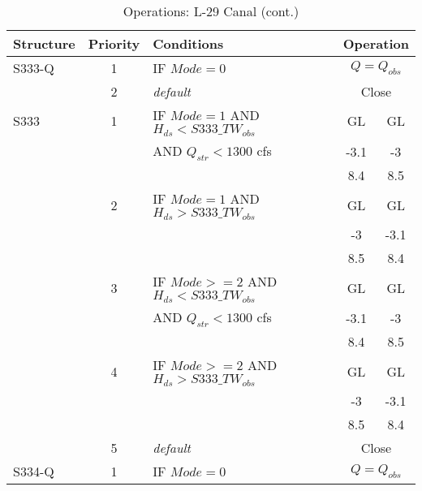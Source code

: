 \scriptsize
\begin{table}[!h]
\centering
\caption{Operations: L-29 Canal (cont.)}
\label{tab:M11opsL29}
\begin{tabular}{|l|c|l|c|c|}
\hline
\textbf{Structure} & \textbf{Priority}  & \textbf{Conditions} & \multicolumn{2}{|c|}{\textbf{Operation}}   \\
\hline
\hline
S333-Q        &  1  & IF $Mode=0$                   & \multicolumn{2}{|c|}{$Q = Q_{obs}$}   \\
\hline
              &  2  & \it{default}                  & \multicolumn{2}{|c|}{Close}           \\
\hline
S333          &  1  & IF $Mode=1$ AND $H_{ds}<S333\_TW_{obs}$                   & GL    & GL   \\
              &     & AND $Q_{str}<1300$ cfs   & -3.1  & -3   \\
              &     &        &  8.4  & 8.5  \\
\hline
              &  2  & IF $Mode=1$  AND $H_{ds}>S333\_TW_{obs}$                 & GL    & GL   \\
              &     &    & -3    & -3.1 \\
              &     &                               & 8.5   & 8.4  \\
\hline
              &  3  & IF $Mode>=2$ AND $H_{ds}<S333\_TW_{obs}$                  & GL    & GL   \\
              &     & AND $Q_{str}<1300$ cfs  & -3.1  & -3   \\
              &     &         &  8.4  & 8.5  \\
\hline
              &  4  & IF $Mode>=2$ AND $H_{ds}>S333\_TW_{obs}$                  & GL    & GL   \\
              &     &   & -3    & -3.1 \\
              &     &                               & 8.5   & 8.4  \\
\hline
              &  5  & \it{default}                  & \multicolumn{2}{|c|}{Close}           \\
\hline
\hline
S334-Q        &  1  & IF $Mode=0$                   & \multicolumn{2}{|c|}{$Q = Q_{obs}$}   \\

\end{tabular}
\end{table}
